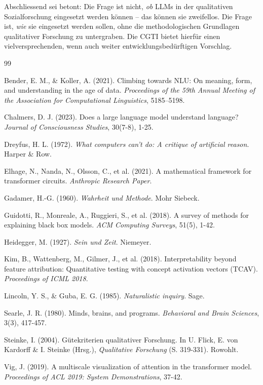 \documentclass[12pt,a4paper]{article}
\begin{document}
Abschliessend sei betont: Die Frage ist nicht, \textit{ob} LLMs in der qualitativen Sozialforschung eingesetzt werden können – das können sie zweifellos. Die Frage ist, \textit{wie} sie eingesetzt werden sollen, ohne die methodologischen Grundlagen qualitativer Forschung zu untergraben. Die CGTI bietet hierfür einen vielversprechenden, wenn auch weiter entwicklungsbedürftigen Vorschlag.

\begin{thebibliography}{99}

Bender, E. M., \& Koller, A. (2021). Climbing towards NLU: On meaning, form, and understanding in the age of data. \textit{Proceedings of the 59th Annual Meeting of the Association for Computational Linguistics}, 5185–5198.

Chalmers, D. J. (2023). Does a large language model understand language? \textit{Journal of Consciousness Studies}, 30(7-8), 1-25.

Dreyfus, H. L. (1972). \textit{What computers can't do: A critique of artificial reason}. Harper \& Row.

Elhage, N., Nanda, N., Olsson, C., et al. (2021). A mathematical framework for transformer circuits. \textit{Anthropic Research Paper}.

Gadamer, H.-G. (1960). \textit{Wahrheit und Methode}. Mohr Siebeck.

Guidotti, R., Monreale, A., Ruggieri, S., et al. (2018). A survey of methods for explaining black box models. \textit{ACM Computing Surveys}, 51(5), 1-42.

Heidegger, M. (1927). \textit{Sein und Zeit}. Niemeyer.

Kim, B., Wattenberg, M., Gilmer, J., et al. (2018). Interpretability beyond feature attribution: Quantitative testing with concept activation vectors (TCAV). \textit{Proceedings of ICML 2018}.

Lincoln, Y. S., \& Guba, E. G. (1985). \textit{Naturalistic inquiry}. Sage.

Searle, J. R. (1980). Minds, brains, and programs. \textit{Behavioral and Brain Sciences}, 3(3), 417-457.

Steinke, I. (2004). Gütekriterien qualitativer Forschung. In U. Flick, E. von Kardorff \& I. Steinke (Hrsg.), \textit{Qualitative Forschung} (S. 319-331). Rowohlt.

Vig, J. (2019). A multiscale visualization of attention in the transformer model. \textit{Proceedings of ACL 2019: System Demonstrations}, 37-42.

\end{thebibliography}
\end{document}
